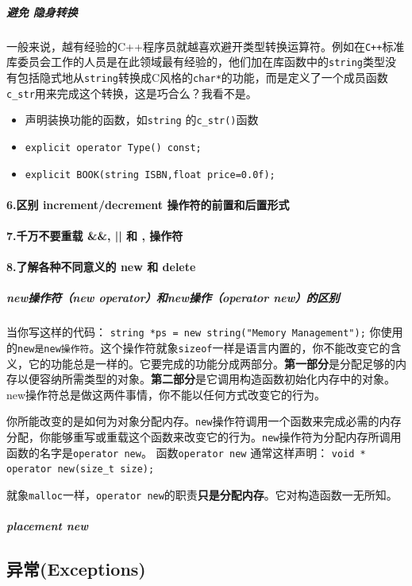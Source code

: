 \documentclass[UTF8,a4paper,12pt]{ctexbook}
\begin{document}
				\subparagraph{避免 隐身转换}	一般来说，越有经验的C++程序员就越喜欢避开类型转换运算符。例如在\verb|C++|标准库委员会工作的人员是在此领域最有经验的，他们加在库函数中的\verb|string|类型没有包括隐式地从\verb|string|转换成C风格的\verb|char*|的功能，而是定义了一个成员函数\verb|c_str|用来完成这个转换，这是巧合么？我看不是。
					\begin{itemize}
						\item 声明装换功能的函数，如\verb|string| 的\verb|c_str()|函数
						\item \verb|explicit operator Type() const;|
						\item \verb|explicit BOOK(string ISBN,float price=0.0f);|
					\end{itemize}
					
			\paragraph{6.区别 increment/decrement 操作符的前置和后置形式}
			\paragraph{7.千万不要重载 \&\&, || 和 , 操作符}
			\paragraph{8.了解各种不同意义的 new 和 delete}
				\subparagraph{new操作符（new operator）和new操作（operator new）的区别}
					当你写这样的代码：
					\verb|string *ps = new string("Memory Management");|
					你使用的\verb|new是new操作符|。这个操作符就象\verb|sizeof|一样是语言内置的，你不能改变它的含义，它的功能总是一样的。它要完成的功能分成两部分。\textbf{第一部分}是分配足够的内存以便容纳所需类型的对象。\textbf{第二部分}是它调用构造函数初始化内存中的对象。new操作符总是做这两件事情，你不能以任何方式改变它的行为。
					
					你所能改变的是如何为对象分配内存。\verb|new|操作符调用一个函数来完成必需的内存分配，你能够重写或重载这个函数来改变它的行为。\verb|new|操作符为分配内存所调用函数的名字是\verb|operator new|。
					函数\verb|operator new| 通常这样声明：
					\verb|void * operator new(size_t size);|
					
					就象\verb|malloc|一样，\verb|operator new|的职责\textbf{只是分配内存}。它对构造函数一无所知。
			
				\subparagraph{placement new}
		\subsection{异常(Exceptions)}
\end{document}
